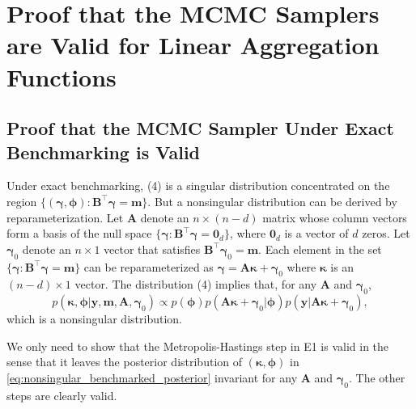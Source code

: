 \documentclass[12pt]{article}
\begin{document}
\section{Proof that the MCMC Samplers are Valid for Linear Aggregation Functions}
  \label{sec:gibbs_proof}

\subsection{Proof that the MCMC Sampler Under Exact Benchmarking is Valid}\label{sec:gibbs_proof_exact}

Under exact benchmarking, (4) is a singular distribution concentrated on the region $\{(\bm{\gamma},\bm{\phi}): \bm{B}^{\top}\bm{\gamma}=\bm{m}\}$.
But a nonsingular distribution can be derived by reparameterization.  Let $\bm{A}$ denote an $n\times (n-d)$ matrix whose column vectors form a basis of the null space $\{\bm{\gamma}:\bm{B}^{\top}\bm{\gamma}=\bm{0}_d\}$, where $\bm{0}_d$ is a vector of $d$ zeros. Let $\bm{\gamma}_0$ denote an $n\times 1$ vector that satisfies $\bm{B}^{\top}\bm{\gamma}_0=\bm{m}$. Each element in the set $\{\bm{\gamma}: \bm{B}^{\top}\bm{\gamma}=\bm{m}\}$ can be reparameterized as $\bm{\gamma}=\bm{A}\bm{\kappa}+\bm{\gamma}_0$ where $\bm{\kappa}$ is an $(n-d)\times 1$ vector.  The distribution (4) implies that, for any $\bm{A}$ and $\bm{\gamma}_0$,
\begin{equation}
p(\bm{\kappa},\bm{\phi}|\bm{y},\bm{m},\bm{A},\bm{\gamma}_0)\propto p(\bm{\phi}) p(\bm{A}\bm{\kappa}+\bm{\gamma}_0 | \bm{\phi}) p(\bm{y} | \bm{A}\bm{\kappa}+\bm{\gamma}_0),\label{eq:nonsingular_benchmarked_posterior}
\end{equation}
which is a nonsingular distribution.

We only need to show that the Metropolis-Hastings step in E1 is valid in the sense that it leaves the posterior distribution of $(\bm{\kappa},\bm{\phi})$ in \eqref{eq:nonsingular_benchmarked_posterior} invariant for any $\bm{A}$ and $\bm{\gamma}_0$. The other steps are clearly valid.
\end{document}
